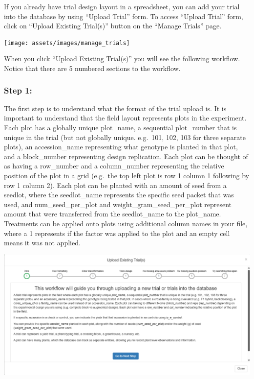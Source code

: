 \documentclass[
  12pt,
]{book}
\begin{document}
If you already have trial design layout in a spreadsheet, you can add your trial into the database by using ``Upload Trial'' form. To access ``Upload Trial'' form, click on ``Upload Existing Trial(s)'' button on the ``Manage Trials'' page.

\begin{center}\texttt{[image: assets/images/manage\_trials]} \end{center}

When you click ``Upload Existing Trial(s)'' you will see the following workflow. Notice that there are 5 numbered sections to the workflow.

\hypertarget{step-1}{%
\subsubsection*{Step 1:}\label{step-1}}


The first step is to understand what the format of the trial upload is. It is important to understand that the field layout represents plots in the experiment. Each plot has a globally unique plot\_name, a sequential plot\_number that is unique in the trial (but not globally unique. e.g.~101, 102, 103 for three separate plots), an accession\_name representing what genotype is planted in that plot, and a block\_number representing design replication. Each plot can be thought of as having a row\_number and a column\_number representing the relative position of the plot in a grid (e.g.~the top left plot is row 1 column 1 following by row 1 column 2). Each plot can be planted with an amount of seed from a seedlot, where the seedlot\_name represents the specific seed packet that was used, and num\_seed\_per\_plot and weight\_gram\_seed\_per\_plot represent amount that were transferred from the seedlot\_name to the plot\_name. Treatments can be applied onto plots using additional column names in your file, where a 1 represents if the factor was applied to the plot and an empty cell means it was not applied.

\begin{center}\includegraphics[width=0.95\linewidth]{assets/images/manage_trials_upload_trial_1} \end{center}
\end{document}
